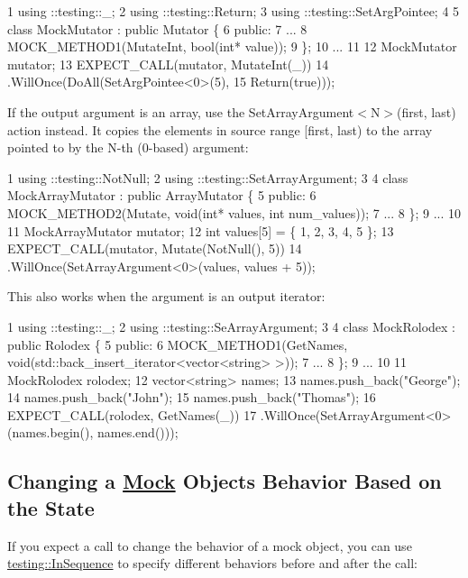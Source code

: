 \begin{DoxyCode}
1 using ::testing::\_;
2 using ::testing::Return;
3 using ::testing::SetArgPointee;
4 
5 class MockMutator : public Mutator \{
6  public:
7   ...
8   MOCK\_METHOD1(MutateInt, bool(int* value));
9 \};
10 ...
11 
12   MockMutator mutator;
13   EXPECT\_CALL(mutator, MutateInt(\_))
14       .WillOnce(DoAll(SetArgPointee<0>(5),
15                       Return(true)));
\end{DoxyCode}


If the output argument is an array, use the {\ttfamily Set\+Array\+Argument$<$N$>$(first, last)} action instead. It copies the elements in source range {\ttfamily \mbox{[}first, last)} to the array pointed to by the {\ttfamily N}-\/th (0-\/based) argument\+:


\begin{DoxyCode}
1 using ::testing::NotNull;
2 using ::testing::SetArrayArgument;
3 
4 class MockArrayMutator : public ArrayMutator \{
5  public:
6   MOCK\_METHOD2(Mutate, void(int* values, int num\_values));
7   ...
8 \};
9 ...
10 
11   MockArrayMutator mutator;
12   int values[5] = \{ 1, 2, 3, 4, 5 \};
13   EXPECT\_CALL(mutator, Mutate(NotNull(), 5))
14       .WillOnce(SetArrayArgument<0>(values, values + 5));
\end{DoxyCode}


This also works when the argument is an output iterator\+:


\begin{DoxyCode}
1 using ::testing::\_;
2 using ::testing::SeArrayArgument;
3 
4 class MockRolodex : public Rolodex \{
5  public:
6   MOCK\_METHOD1(GetNames, void(std::back\_insert\_iterator<vector<string> >));
7   ...
8 \};
9 ...
10 
11   MockRolodex rolodex;
12   vector<string> names;
13   names.push\_back("George");
14   names.push\_back("John");
15   names.push\_back("Thomas");
16   EXPECT\_CALL(rolodex, GetNames(\_))
17       .WillOnce(SetArrayArgument<0>(names.begin(), names.end()));
\end{DoxyCode}


\subsection*{Changing a \hyperlink{class_mock}{Mock} Object\textquotesingle{}s Behavior Based on the State}

If you expect a call to change the behavior of a mock object, you can use {\ttfamily \hyperlink{classtesting_1_1_in_sequence}{testing\+::\+In\+Sequence}} to specify different behaviors before and after the call\+:


